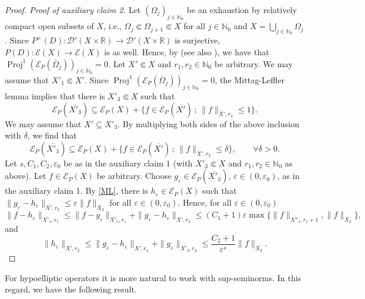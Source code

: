 \documentclass[12pt]{amsart}
\newcommand{\N}{\mathbb{N}}
\newcommand{\R}{\mathbb{R}}
\theoremstyle{definition}
\theoremstyle{remark}
\numberwithin{equation}{section}
\begin{document}
\begin{proof}
\emph{Proof of auxiliary claim 2.}
 Let $(\Omega_j)_{j \in \N_0}$ be an  exhaustion by relatively compact open subsets of $X$, i.e., $\Omega_j \Subset \Omega_{j+1} \Subset X$ for all $j \in \N_0$  and $X = \bigcup_{j \in \N_0} \Omega_j$. Since $P^+(D): \mathscr{D}'(X \times \R) \to \mathscr{D}'(X \times \R)$ is surjective, $P(D): \mathscr{E}(X) \to \mathscr{E}(X)$ is as well. Hence, by \cite[Lemma 3.1]{DeKa22} (see also \cite[Section 3.4.4]{Wengenroth}), we have that $\operatorname{Proj}^1( \mathscr{E}_P(\overline{\Omega}_j))_{j \in \N_0} = 0$.
 Let  $X' \Subset X$ and $r_1,r_2\in\N_0$  be arbitrary.  We may assume that $X'_1 \Subset X'$. Since $\operatorname{Proj}^1( \mathscr{E}_P(\overline{\Omega}_j))_{j \in \N_0} = 0$, the Mittag-Leffler lemma \cite[Theorem 3.2.8]{Wengenroth} implies that there is $X'_3 \Subset X$ such that
 \[
 \mathscr{E}_P(\overline{X'_3}) \subseteq \mathscr{E}_P(X) + \{ f \in \mathscr{E}_P(\overline{X'}) \, ; \, \| f \|_{\overline{X'},r_2} \leq 1 \}.
 \]
 We may assume that $X' \subseteq X'_3$.
 By multiplying both sides of the above inclusion with $\delta$, we find that
 \begin{equation}
 	\label{ML}
 \mathscr{E}_P(\overline{X'_3}) \subseteq \mathscr{E}_P(X) + \{ f \in \mathscr{E}_P(\overline{X'}) \, ; \, \| f \|_{\overline{X'},r_2} \leq \delta \}, \qquad \forall \delta > 0.
 \end{equation}
 Let $s,C_1,C_2, \varepsilon_0$ be as in the auxiliary claim 1 (with $X'_3 \Subset X$ and  $r_1,r_2\in\N_0$ as above). Let $f\in\mathscr{E}_P(X)$  be arbitrary. Choose $g_\varepsilon \in\mathscr{E}_P(\overline{X'_3})$, $\varepsilon\in (0,\varepsilon_0)$, as in the auxiliary claim 1. By \eqref{ML}, there is $h_\varepsilon \in \mathscr{E}_P(X)$ such that  $\|g_\varepsilon-h_\varepsilon\|_{\overline{X'},r_2}\leq \varepsilon  \|f\|_{\overline{X_2}}$ for all $\varepsilon\in (0,\varepsilon_0)$. Hence, for all $\varepsilon \in (0,\varepsilon_0)$
$$
 \| f - h_\varepsilon\|_{\overline{X'_1}, r_1} \leq \| f -   g_\varepsilon\|_{\overline{X'_1}, r_1}
 + \| g_\varepsilon - h_\varepsilon\|_{\overline{X'}, r_2} \leq
 (C_1 +1) \varepsilon\max\{\|f\|_{\overline{X''_1}, r_1+1}, \|f\|_{\overline{X_2}}\}, 
 $$
 and
 $$
 \|  h_\varepsilon\|_{\overline{X'}, r_2} \leq  \|  g_\varepsilon - h_\varepsilon\|_{\overline{X'}, r_2} + \|  g_\varepsilon\|_{\overline{X'_3}, r_2}  \leq \frac{C_2 +1}{\varepsilon^s} \|f\|_{\overline{X_2}}.
 $$
\end{proof}



For hypoelliptic operators it is more natural to work with sup-seminorms. In this regard, we have the following result.
\end{document}
